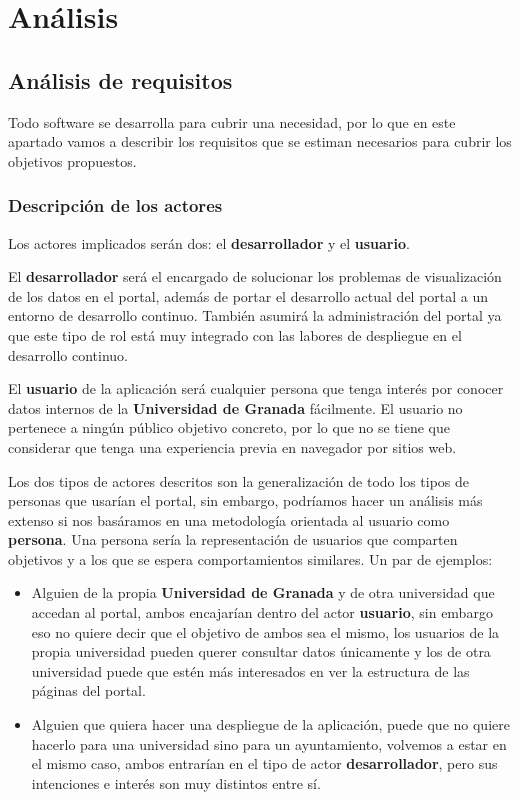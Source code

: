 \chapter{Análisis}

\section{Análisis de requisitos}

Todo software se desarrolla para cubrir una necesidad, por lo que en este apartado vamos a describir los requisitos que se estiman necesarios para cubrir los objetivos propuestos.

\subsection{Descripción de los actores}

Los actores implicados serán dos: el \textbf{desarrollador} y el \textbf{usuario}.

\bigskip
El \textbf{desarrollador} será el encargado de solucionar los problemas de visualización de los datos en el portal, además de portar el desarrollo actual del portal a un entorno de desarrollo continuo. También asumirá la administración del portal ya que este tipo de rol está muy integrado con las labores de despliegue en el desarrollo continuo.

\bigskip
El \textbf{usuario} de la aplicación será cualquier persona que tenga interés por conocer datos internos de la \textbf{Universidad de Granada} fácilmente. El usuario no pertenece a ningún público objetivo concreto, por lo que no se tiene que considerar que tenga una experiencia previa en navegador por sitios web.

\bigskip
Los dos tipos de actores descritos son la generalización de todo los tipos de personas que usarían el portal, sin embargo, podríamos hacer un análisis más extenso si nos basáramos en una metodología orientada al usuario como \textbf{persona}. Una persona sería la representación de usuarios que comparten objetivos y a los que se espera comportamientos similares. Un par de ejemplos:

\newpage
\begin{itemize}
	\item Alguien de la propia \textbf{Universidad de Granada} y de otra universidad que accedan al portal, ambos encajarían dentro del actor \textbf{usuario}, sin embargo eso no quiere decir que el objetivo de ambos sea el mismo, los usuarios de la propia universidad pueden querer consultar datos únicamente y los de otra universidad puede que estén más interesados en ver la estructura de las páginas del portal.
	\item Alguien que quiera hacer una despliegue de la aplicación, puede que no quiere hacerlo para una universidad sino para un ayuntamiento, volvemos a estar en el mismo caso, ambos entrarían en el tipo de actor \textbf{desarrollador}, pero sus intenciones e interés son muy distintos entre sí.
\end{itemize}

